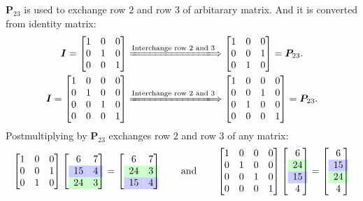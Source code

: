 \begin{example}
$\bm P_{23}$ is used to exchange row $2$ and row $3$ of arbitarary matrix. And it is converted from identity matrix:
\begin{gather*}
\bm I=\begin{bmatrix}
1&0&0\\0&1&0\\0&0&1
\end{bmatrix}
\xLongrightarrow{\text{Interchange row $2$ and $3$}}
\begin{bmatrix}
1&0&0\\0&0&1\\0&1&0
\end{bmatrix}=\bm P_{23}.\\
\bm I=\begin{bmatrix}
1&0&0&0\\0&1&0&0\\0&0&1&0\\0&0&0&1
\end{bmatrix}
\xLongrightarrow{\text{Interchange row $2$ and $3$}}
\begin{bmatrix}
1&0&0&0\\0&0&1&0\\0&1&0&0\\0&0&0&1
\end{bmatrix}=\bm P_{23}.
\end{gather*}
Postmultiplying by $\bm P_{23}$ exchanges row $2$ and row $3$ of any matrix:
\[
\begin{bmatrix}
1&0&0\\0&0&1\\0&1&0
\end{bmatrix}
\left[
\begin{array}{cc@{}}
6&7\\
\rowcolor{blue!20}
15&4\\
\rowcolor{green!20}
24&3
\end{array}
\right]=
\left[
\begin{array}{cc@{}}
6&7\\
\rowcolor{green!20}
24&3\\
\rowcolor{blue!20}
15&4
\end{array}
\right]
\qquad\text{and}\qquad
\begin{bmatrix}
1&0&0&0\\0&1&0&0\\0&0&1&0\\0&0&0&1
\end{bmatrix}
\left[
\begin{array}{c@{}}
6\\
\rowcolor{green!20}
24\\
\rowcolor{blue!20}
15\\
4
\end{array}\right]
=\left[
\begin{array}{c@{}}
6\\
\rowcolor{blue!20}
15\\
\rowcolor{green!20}
24\\
4
\end{array}\right]
\]
\end{example}
